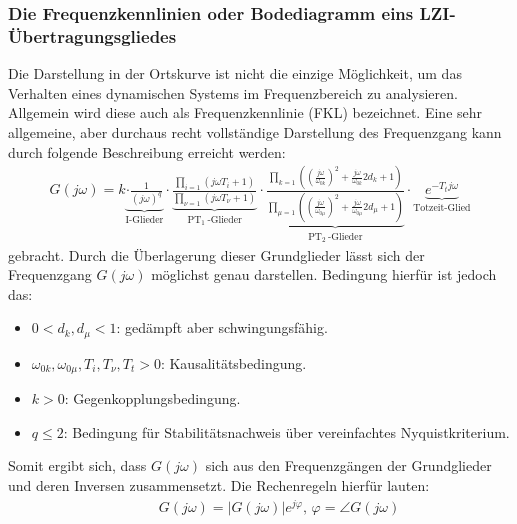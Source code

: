 \subsubsection{Die Frequenzkennlinien oder Bodediagramm eins LZI-Übertragungsgliedes \cite{Lunze10}}
%
Die Darstellung in der Ortskurve ist nicht die einzige Möglichkeit, um das Verhalten eines dynamischen Systems im Frequenzbereich zu analysieren. Allgemein wird diese auch als Frequenzkennlinie (FKL) bezeichnet. Eine sehr allgemeine, aber durchaus recht vollständige Darstellung des Frequenzgang kann durch folgende Beschreibung erreicht werden:
%
\begin{equation*}
\begin{aligned}
%
G(j\omega)=k \underbrace{\cdot \frac{1}{(j\omega)^{q}}}_{\text{I-Glieder}} \cdot \underbrace{\frac{\prod_{i=1}\left(j \omega T_{i}+1\right)}{\prod_{\nu=1}\left(j \omega T_{\nu}+1\right)}}_{\text{PT}_{1}~\text{-Glieder}} 
%
\cdot\underbrace{\frac{\prod_{k=1}\left(\left(\frac{j \omega}{\omega_{0 k}}\right)^{2}+\frac{j \omega}{\omega_{0 k}} 2 d_{k}+1\right)}{\prod_{\mu=1}\left(\left(\frac{j \omega}{\omega_{0 \mu}}\right)^{2}+\frac{j \omega}{\omega_{0 \mu}} 2 d_{\mu}+1\right)}}_{\text{PT}_{2}~\text{-Glieder}} 
%
\cdot \underbrace{e^{-T_{t}j\omega}}_{\text{Totzeit-Glied}} 
%
\end{aligned}
\end{equation*}  
%
gebracht. Durch die Überlagerung dieser Grundglieder lässt sich der Frequenzgang $G(j\omega)$ möglichst genau darstellen. Bedingung hierfür ist jedoch das:
%
\begin{itemize}
	\item $0<d_{k},d_{\mu}<1$: gedämpft aber schwingungsfähig.
	\item $\omega_{0k},\omega_{0\mu},T_{i},T_{\nu},T_{t}>0$: Kausalitätsbedingung.
	\item $k>0$: Gegenkopplungsbedingung.
	\item $q \le 2$: Bedingung für Stabilitätsnachweis über vereinfachtes Nyquistkriterium. 
\end{itemize}
%
Somit ergibt sich, dass $G(j\omega)$ sich aus den Frequenzgängen der Grundglieder und deren Inversen zusammensetzt. Die Rechenregeln hierfür lauten:
%
\begin{equation*}
\begin{aligned}
%
\quad\quad &G(j\omega)=|G(j\omega)|e^{j\varphi},\,\varphi=\angle G(j\omega)\\
%
\end{aligned}
\end{equation*}
